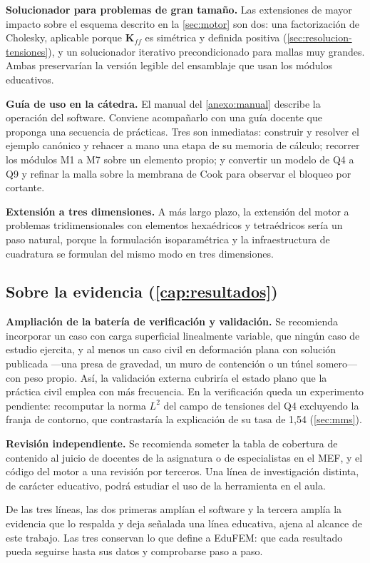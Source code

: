 \textbf{Solucionador para problemas de gran tamaño.} Las extensiones de mayor impacto sobre el esquema descrito en la \autoref{sec:motor} son dos: una factorización de Cholesky, aplicable porque $\bm{K}_{ff}$ es simétrica y definida positiva (\autoref{sec:resolucion-tensiones}), y un solucionador iterativo precondicionado para mallas muy grandes. Ambas preservarían la versión legible del ensamblaje que usan los módulos educativos.

\textbf{Guía de uso en la cátedra.} El manual del \autoref{anexo:manual} describe la operación del software. Conviene acompañarlo con una guía docente que proponga una secuencia de prácticas. Tres son inmediatas: construir y resolver el ejemplo canónico y rehacer a mano una etapa de su memoria de cálculo; recorrer los módulos M1 a M7 sobre un elemento propio; y convertir un modelo de Q4 a Q9 y refinar la malla sobre la membrana de Cook para observar el bloqueo por cortante.

\textbf{Extensión a tres dimensiones.} A más largo plazo, la extensión del motor a problemas tridimensionales con elementos hexaédricos y tetraédricos sería un paso natural, porque la formulación isoparamétrica y la infraestructura de cuadratura se formulan del mismo modo en tres dimensiones.

\subsection*{Sobre la evidencia (\autoref{cap:resultados})}

\textbf{Ampliación de la batería de verificación y validación.} Se recomienda incorporar un caso con carga superficial linealmente variable, que ningún caso de estudio ejercita, y al menos un caso civil en deformación plana con solución publicada —una presa de gravedad, un muro de contención o un túnel somero— con peso propio. Así, la validación externa cubriría el estado plano que la práctica civil emplea con más frecuencia. En la verificación queda un experimento pendiente: recomputar la norma $L^2$ del campo de tensiones del Q4 excluyendo la franja de contorno, que contrastaría la explicación de su tasa de 1,54 (\autoref{sec:mms}).

\textbf{Revisión independiente.} Se recomienda someter la tabla de cobertura de contenido al juicio de docentes de la asignatura o de especialistas en el MEF, y el código del motor a una revisión por terceros. Una línea de investigación distinta, de carácter educativo, podrá estudiar el uso de la herramienta en el aula.

De las tres líneas, las dos primeras amplían el software y la tercera amplía la evidencia que lo respalda y deja señalada una línea educativa, ajena al alcance de este trabajo. Las tres conservan lo que define a EduFEM: que cada resultado pueda seguirse hasta sus datos y comprobarse paso a paso.
